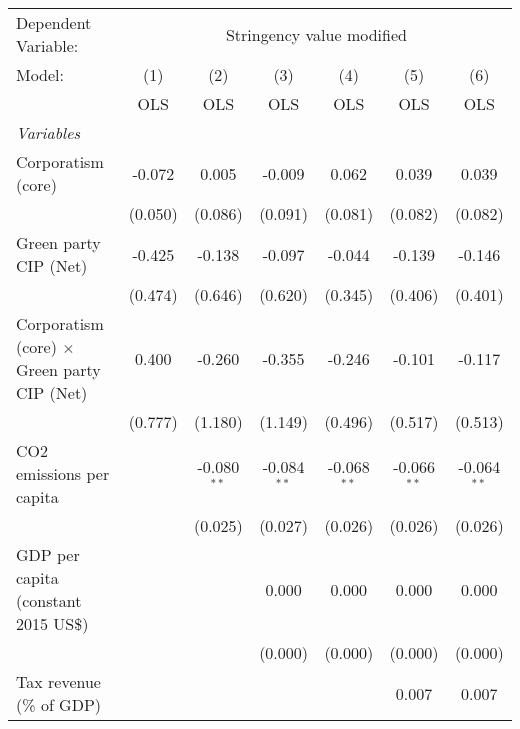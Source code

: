 
\begingroup
\centering
\begin{tabular}{lcccccc}
   \toprule
   Dependent Variable: & \multicolumn{6}{c}{Stringency value modified}\\
   Model:                                             & (1)     & (2)           & (3)           & (4)           & (5)           & (6)\\  
                                                      &  OLS    & OLS           & OLS           & OLS           & OLS           & OLS\\  
   \midrule
   \emph{Variables}\\
   Corporatism (core)                                 & -0.072  & 0.005         & -0.009        & 0.062         & 0.039         & 0.039\\   
                                                      & (0.050) & (0.086)       & (0.091)       & (0.081)       & (0.082)       & (0.082)\\   
   Green party CIP (Net)                              & -0.425  & -0.138        & -0.097        & -0.044        & -0.139        & -0.146\\   
                                                      & (0.474) & (0.646)       & (0.620)       & (0.345)       & (0.406)       & (0.401)\\   
   Corporatism (core) $\times$ Green party CIP (Net)  & 0.400   & -0.260        & -0.355        & -0.246        & -0.101        & -0.117\\   
                                                      & (0.777) & (1.180)       & (1.149)       & (0.496)       & (0.517)       & (0.513)\\   
   CO2 emissions per capita                           &         & -0.080$^{**}$ & -0.084$^{**}$ & -0.068$^{**}$ & -0.066$^{**}$ & -0.064$^{**}$\\   
                                                      &         & (0.025)       & (0.027)       & (0.026)       & (0.026)       & (0.026)\\   
   GDP per capita (constant 2015 US\$)                &         &               & 0.000         & 0.000         & 0.000         & 0.000\\   
                                                      &         &               & (0.000)       & (0.000)       & (0.000)       & (0.000)\\   
   Tax revenue (\% of GDP)                            &         &               &               &               & 0.007         & 0.007\\   

\end{tabular}
